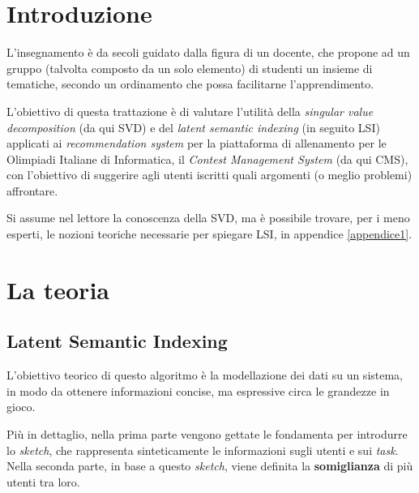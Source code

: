\documentclass[12pt,a4paper]{article}
\theoremstyle{thm}
\theoremstyle{def}
\begin{document}

\tableofcontents
\newpage

							
\section{Introduzione}
L'insegnamento è da secoli guidato dalla figura di un docente, che propone ad un gruppo (talvolta composto da un solo elemento) di studenti un insieme di tematiche, secondo un ordinamento che possa facilitarne l'apprendimento.

L'obiettivo di questa trattazione è di valutare l'utilità della \textit{singular value decomposition} (da qui SVD) e del {\it latent semantic indexing} (in seguito LSI) applicati ai \textit{recommendation system} per la piattaforma di allenamento per le Olimpiadi Italiane di Informatica, il \textit{Contest Management System} (da qui CMS), con l'obiettivo di suggerire agli utenti iscritti quali argomenti (o meglio problemi) affrontare.

Si assume nel lettore la conoscenza della SVD, ma è possibile trovare, per i meno esperti, le nozioni teoriche necessarie per spiegare LSI, in appendice \ref{appendice1}.


							
\section{La teoria}


\subsection{Latent Semantic Indexing}
L'obiettivo teorico di questo algoritmo è la modellazione dei dati su un sistema, in modo da ottenere informazioni concise, ma espressive circa le grandezze in gioco.

Più in dettaglio, nella prima parte vengono gettate le fondamenta per introdurre lo \textit{sketch}, che rappresenta sinteticamente le informazioni sugli utenti e sui \textit{task}. Nella seconda parte, in base a questo \textit{sketch}, viene definita la \textbf{somiglianza} di più utenti tra loro.
\end{document}
